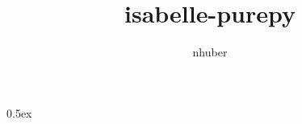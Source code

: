 \documentclass[11pt,a4paper]{article}
\begin{document}
\title{isabelle-purepy}
\author{nhuber}
\maketitle

\tableofcontents

\parindent 0pt\parskip 0.5ex



%
%
\end{document}
